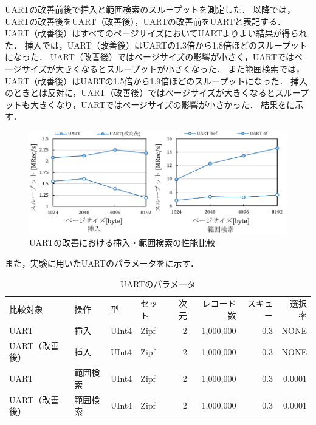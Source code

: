 UARTの改善前後で挿入と範囲検索のスループットを測定した．
以降では，UARTの改善後をUART（改善後），UARTの改善前をUARTと表記する．
UART（改善後）はすべてのページサイズにおいてUARTよりよい結果が得られた．
挿入では，UART（改善後）はUARTの1.3倍から1.8倍ほどのスループットになった．
UART（改善後）ではページサイズの影響が小さく，UARTではページサイズが大きくなるとスループットが小さくなった．
また範囲検索では，UART（改善後）はUARTの1.5倍から1.9倍ほどのスループットになった．
挿入のときとは反対に，UART（改善後）ではページサイズが大きくなるとスループットも大きくなり，UARTではページサイズの影響が小さかった．
結果を\Fig{\ref{graph:pagesize}}に示す．
\begin{figure}[tb]
  \centering
  \includegraphics{./figures/graph-pagesize.pdf}
  \caption{UARTの改善における挿入・範囲検索の性能比較}
  \label{graph:pagesize}
\end{figure}
また，実験に用いたUARTのパラメータを\Tab{\ref{tab:pagesize}}に示す．
\begin{table}[tb]
  \caption{UARTのパラメータ}
  \label{tab:pagesize}
  \centering \small \small
  \begin{tabular}{llllrrrr}
    \toprule
    比較対象       & 操作     & 型    & セット & 次元 & レコード数 & スキュー & 選択率 \\
    \cmidrule(lr){1-1}
    \cmidrule(lr){2-2}
    \cmidrule(lr){3-3}
    \cmidrule(lr){4-4}
    \cmidrule(lr){5-5}
    \cmidrule(lr){6-6}
    \cmidrule(lr){7-7}
    \cmidrule(lr){8-8}
    UART           & 挿入     & UInt4 & Zipf   & 2    & 1,000,000  & 0.3      & NONE   \\
    UART（改善後） & 挿入     & UInt4 & Zipf   & 2    & 1,000,000  & 0.3      & NONE   \\
    UART           & 範囲検索 & UInt4 & Zipf   & 2    & 1,000,000  & 0.3      & 0.0001 \\
    UART（改善後） & 範囲検索 & UInt4 & Zipf   & 2    & 1,000,000  & 0.3      & 0.0001 \\
    \bottomrule
  \end{tabular}
\end{table}


